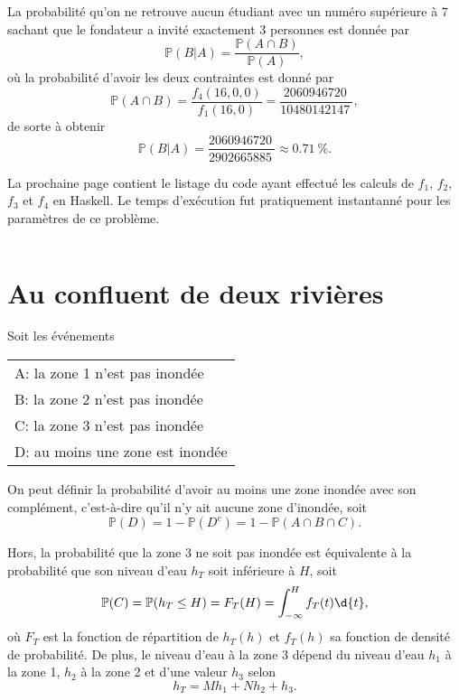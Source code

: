 \documentclass[11pt]{article}
\begin{document}
La probabilité qu'on ne retrouve aucun étudiant avec un numéro supérieure à 7
sachant que le fondateur a invité exactement 3 personnes est donnée par
\begin{equation*}
    \mathbb{P}(B|A)
    =\frac{\mathbb{P}(A\cap B)}{\mathbb{P}(A)},
\end{equation*}
où la probabilité d'avoir les deux contraintes est donné par
\begin{equation*}
    \mathbb{P}(A\cap B)
    =\frac{f_4(16,0,0)}{f_1(16,0)}
    =\frac{\SI{2060946720}{}}{\SI{10480142147}{}},
\end{equation*}
de sorte à obtenir
\begin{equation*}
    \mathbb{P}(B|A)
    =\frac{\SI{2060946720}{}}{\SI{2902665885}{}}
    \approx\SI{0.71}{\percent}.
\end{equation*}

La prochaine page contient le listage du code ayant effectué les calculs de
$f_1$, $f_2$, $f_3$ et $f_4$ en Haskell. Le temps d'exécution fut pratiquement
instantanné pour les paramètres de ce problème.

\pagebreak
\inputminted[linenos]{haskell}{groupe/src/Main.hs}

\pagebreak
\section{Au confluent de deux rivières}
Soit les événements
\begin{table}[H]
    \centering
    \begin{tabular}{l}
        A: la zone 1 n'est pas inondée\\
        B: la zone 2 n'est pas inondée\\
        C: la zone 3 n'est pas inondée\\
        D: au moins une zone est inondée\\
    \end{tabular}
\end{table}

On peut définir la probabilité d'avoir au moins une zone inondée avec
son complément, c'est-à-dire qu'il n'y ait aucune zone d'inondée, soit
\begin{equation*}
    \mathbb{P}(D)=1-\mathbb{P}(D^c)=1-\mathbb{P}(A\cap B\cap C).
\end{equation*}

Hors, la probabilité que la zone 3 ne soit pas inondée est équivalente
à la probabilité que son niveau d'eau $h_T$ soit inférieure à $H$, soit
\begin{equation}\label{eq:int_ft}
    \mathbb{P}(C)=\mathbb{P}(h_T\leq H)=F_T(H)=\int_{-\infty}^Hf_T(t)\d{t},
\end{equation}
où $F_T$ est la fonction de répartition de $h_T(h)$ et $f_T(h)$ sa fonction
de densité de probabilité. De plus, le niveau d'eau à la zone 3 dépend
du niveau d'eau $h_1$ à la zone 1, $h_2$ à la zone 2 et d'une valeur
$h_3$ selon
\begin{equation*}
    h_T=Mh_1+Nh_2+h_3.
\end{equation*}
\end{document}
